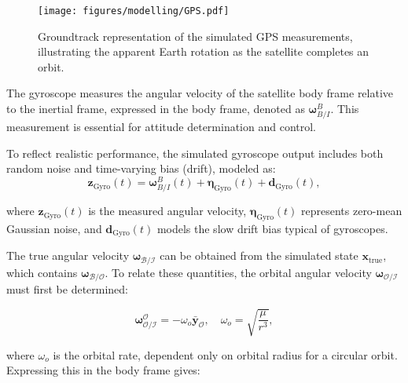 \begin{figure}[H]
    \centering
    \texttt{[image: figures/modelling/GPS.pdf]}
    \caption{Groundtrack representation of the simulated GPS measurements, illustrating the apparent Earth rotation as the satellite completes an orbit.}
    \label{fig:GPS}
\end{figure}

\label{sec:GyroModel}

The gyroscope measures the angular velocity of the satellite body frame relative to the inertial frame, expressed in the body frame, denoted as $\boldsymbol{\omega}^B_{B/I}$. This measurement is essential for attitude determination and control.
\vspace{0.5cm}

\noindent To reflect realistic performance, the simulated gyroscope output includes both random noise and time-varying bias (drift), modeled as:
\begin{equation}
    \mathbf{z}_{\text{Gyro}}(t) = \boldsymbol{\omega}^B_{B/I}(t) + \boldsymbol{\eta}_{\text{Gyro}}(t) + \mathbf{d}_{\text{Gyro}}(t),
\end{equation}

\noindent where $\mathbf{z}_{\text{Gyro}}(t)$ is the measured angular velocity, $\boldsymbol{\eta}_{\text{Gyro}}(t)$ represents zero-mean Gaussian noise, and $\mathbf{d}_{\text{Gyro}}(t)$ models the slow drift bias typical of gyroscopes.

\vspace{0.5cm}
\noindent The true angular velocity $\boldsymbol{\omega}_{\mathcal{B}/\mathcal{I}}$ can be obtained from the simulated state $\mathbf{x}_{\text{true}}$, which contains $\boldsymbol{\omega}_{\mathcal{B}/\mathcal{O}}$. To relate these quantities, the orbital angular velocity $\boldsymbol{\omega}_{\mathcal{O}/\mathcal{I}}$ must first be determined:

\begin{equation}
    \boldsymbol{\omega}_\mathcal{O/I}^\mathcal{O} = -\omega_o\mathbf{\bar{y}}_\mathcal{O}, \quad
    \omega_o = \sqrt{\frac{\mu}{r^3}},
\end{equation}

\noindent where $\omega_o$ is the orbital rate, dependent only on orbital radius for a circular orbit. Expressing this in the body frame gives:

